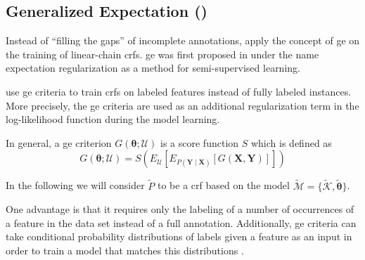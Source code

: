 \subsection{Generalized Expectation ()}

Instead of ``filling the gaps'' of incomplete annotations, \citet{mann2008generalized} apply the concept of \gls{ge} on the training of linear-chain \glspl{crf}.
\Gls{ge} was first proposed in \citet{mann2007simple} under the name \gls{expectation regularization} as a method for semi-supervised learning.

\citet{mann2008generalized} use \gls{ge} criteria to train \glspl{crf} on labeled features instead of fully labeled instances.
More precisely, the \gls{ge} criteria are used as an additional regularization term in the log-likelihood function during the model learning.

In general, a \gls{ge} criterion $G(\bm{\theta};\mathcal{U})$ is a score function $S$ which is defined as~\citep{mann2010generalized}
\begin{equation}
  \label{equ:generalized-expectation}
  G(\bm{\theta};\mathcal{U})=S\left(E_{\mathcal{U}}\left[E_{P(\bm{Y}\mid\bm{X})}\left[G(\bm{X},\bm{Y})\right]\right]\right)
\end{equation}

In the following we will consider $\tilde{P}$ to be a \gls{crf} based on the model $\tilde{\mathcal{M}}=\{\tilde{\mathcal{K}},\bm{\tilde{\theta}}\}$.



One advantage is that it requires only the labeling of a number of occurrences of a feature in the data set instead of a full annotation.
Additionally, \gls{ge} criteria can take \glspl{conditional probability distribution} of labels given a feature as an input in order to train a model that matches this distributions \citep{mann2008generalized}.

\bigskip

